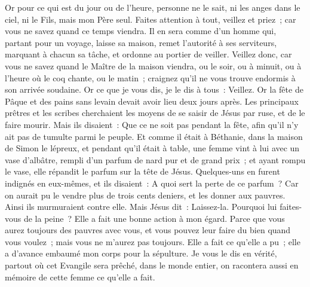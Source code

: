 \begin{multicols}{2}
Or pour ce qui est du jour ou de l'heure, personne ne le sait, ni les anges dans le ciel, ni le Fils, mais mon Père seul.
Faites attention à tout, veillez et priez~; car vous ne savez quand ce temps viendra.
Il en sera comme d'un homme qui, partant pour un voyage, laisse sa maison, remet l'autorité à ses serviteurs, marquant à chacun sa tâche, et ordonne au portier de veiller.
Veillez donc, car vous ne savez quand le Maître de la maison viendra, ou le soir, ou à minuit, ou à l'heure où le coq chante, ou le matin~;
craignez qu'il ne vous trouve endormis à son arrivée soudaine.
Or ce que je vous dis, je le dis à tous~: Veillez.
\VerseOne{}Or la fête de Pâque et des pains sans levain devait avoir lieu deux jours après. Les principaux prêtres et les scribes cherchaient les moyens de se saisir de Jésus par ruse, et de le faire mourir.
Mais ils disaient~: Que ce ne soit pas pendant la fête, afin qu'il n'y ait pas de tumulte parmi le peuple.
Et comme il était à Béthanie, dans la maison de Simon le lépreux, et pendant qu'il était à table, une femme vint à lui avec un vase d'albâtre, rempli d'un parfum de nard pur et de grand prix~; et ayant rompu le vase, elle répandit le parfum sur la tête de Jésus.
Quelques-uns en furent indignés en eux-mêmes, et ils disaient~: A quoi sert la perte de ce parfum~?
Car on aurait pu le vendre plus de trois cents deniers, et les donner aux pauvres. Ainsi ils murmuraient contre elle.
Mais Jésus dit~: Laissez-la. Pourquoi lui faites-vous de la peine~? Elle a fait une bonne action à mon égard.
Parce que vous aurez toujours des pauvres avec vous, et vous pouvez leur faire du bien quand vous voulez~; mais vous ne m'aurez pas toujours.
Elle a fait ce qu'elle a pu~; elle a d'avance embaumé mon corps pour la sépulture.
Je vous le dis en vérité, partout où cet Evangile sera prêché, dans le monde entier, on racontera aussi en mémoire de cette femme ce qu'elle a fait.

\end{multicols}
